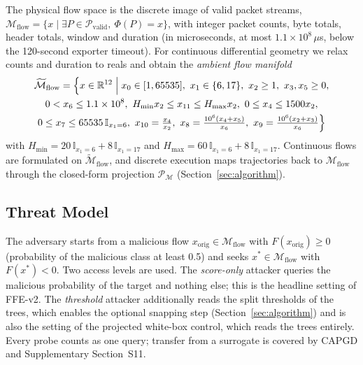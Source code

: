 The physical flow space is the discrete image of valid packet streams, $\mathcal{M}_{\text{flow}}=\{x\mid\exists P\in\mathcal{P}_{\text{valid}},\ \Phi(P)=x\}$, with integer packet counts, byte totals, header totals, window and duration (in microseconds, at most $1.1\times10^8\,\mu$s, below the 120-second exporter timeout). For continuous differential geometry we relax counts and duration to reals and obtain the \emph{ambient flow manifold}
\begin{gather}
    \widetilde{\mathcal{M}}_{\text{flow}}=\Big\{x\in\mathbb{R}^{12}\;\Big|\;x_0\in[1,65535],\ x_1\in\{6,17\},\ x_2\ge1,\ x_3,x_5\ge0,\notag\\
    0<x_6\le1.1\times10^8,\ H_{\min}x_2\le x_{11}\le H_{\max}x_2,\ 0\le x_4\le1500x_2,\notag\\
    0\le x_7\le65535\,\mathbb{I}_{x_1=6},\ x_{10}=\tfrac{x_4}{x_2},\ x_8=\tfrac{10^6(x_4+x_5)}{x_6},\ x_9=\tfrac{10^6(x_2+x_3)}{x_6}\Big\}
\end{gather}
with $H_{\min}=20\,\mathbb{I}_{x_1=6}+8\,\mathbb{I}_{x_1=17}$ and $H_{\max}=60\,\mathbb{I}_{x_1=6}+8\,\mathbb{I}_{x_1=17}$. Continuous flows are formulated on $\widetilde{\mathcal{M}}_{\text{flow}}$, and discrete execution maps trajectories back to $\mathcal{M}_{\text{flow}}$ through the closed-form projection $\mathcal{P}_{\mathcal{M}}$ (Section~\ref{sec:algorithm}).

\subsection{Threat Model}
The adversary starts from a malicious flow $x_{\text{orig}}\in\mathcal{M}_{\text{flow}}$ with $F(x_{\text{orig}})\ge0$ (probability of the malicious class at least 0.5) and seeks $x^*\in\mathcal{M}_{\text{flow}}$ with $F(x^*)<0$. Two access levels are used. The \emph{score-only} attacker queries the malicious probability of the target and nothing else; this is the headline setting of FFE-v2. The \emph{threshold} attacker additionally reads the split thresholds of the trees, which enables the optional snapping step (Section~\ref{sec:algorithm}) and is also the setting of the projected white-box control, which reads the trees entirely. Every probe counts as one query; transfer from a surrogate is covered by CAPGD and Supplementary Section~S11.

